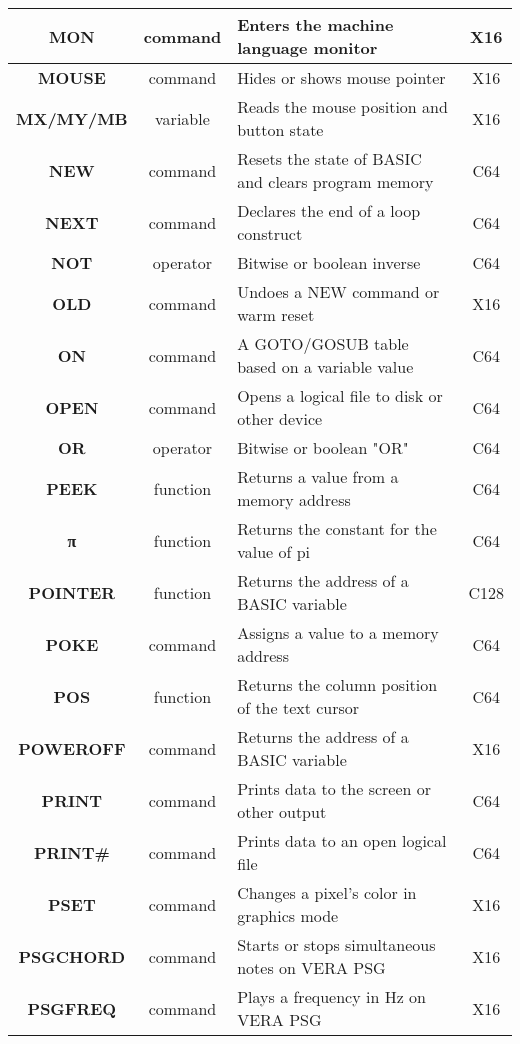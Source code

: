 \begin{longtable}{|c|c|m{4cm}|c|}
	{\bfseries MON} & command & Enters the machine language monitor & X16 \\ \hline
	{\bfseries MOUSE} & command & Hides or shows mouse pointer & X16 \\ \hline
	{\bfseries MX/MY/MB} & variable & Reads the mouse position and button state & X16 \\ \hline
	{\bfseries NEW} & command & Resets the state of BASIC and clears program memory & C64 \\ \hline
	{\bfseries NEXT} & command & Declares the end of a loop construct & C64 \\ \hline
	{\bfseries NOT} & operator & Bitwise or boolean inverse & C64 \\ \hline
	{\bfseries OLD} & command & Undoes a NEW command or warm reset & X16 \\ \hline
	{\bfseries ON} & command & A GOTO/GOSUB table based on a variable value & C64 \\ \hline
	{\bfseries OPEN} & command & Opens a logical file to disk or other device & C64 \\ \hline
	{\bfseries OR} & operator & Bitwise or boolean "OR" & C64 \\ \hline
	{\bfseries PEEK} & function & Returns a value from a memory address & C64 \\ \hline
	{\ttfamily\bfseries π} & function & Returns the constant for the value of pi & C64 \\ \hline
	{\bfseries POINTER} & function & Returns the address of a BASIC variable & C128 \\ \hline
	{\bfseries POKE} & command & Assigns a value to a memory address & C64 \\ \hline
	{\bfseries POS} & function & Returns the column position of the text cursor & C64 \\ \hline
	{\bfseries POWEROFF} & command & Returns the address of a BASIC variable & X16 \\ \hline
	{\bfseries PRINT} & command & Prints data to the screen or other output & C64 \\ \hline
	{\bfseries PRINT\#} & command & Prints data to an open logical file & C64 \\ \hline
	{\bfseries PSET} & command & Changes a pixel's color in graphics mode & X16 \\ \hline
	{\bfseries PSGCHORD} & command & Starts or stops simultaneous notes on VERA PSG & X16 \\ \hline
	{\bfseries PSGFREQ} & command & Plays a frequency in Hz on VERA PSG & X16 \\ \hline

\end{longtable}
